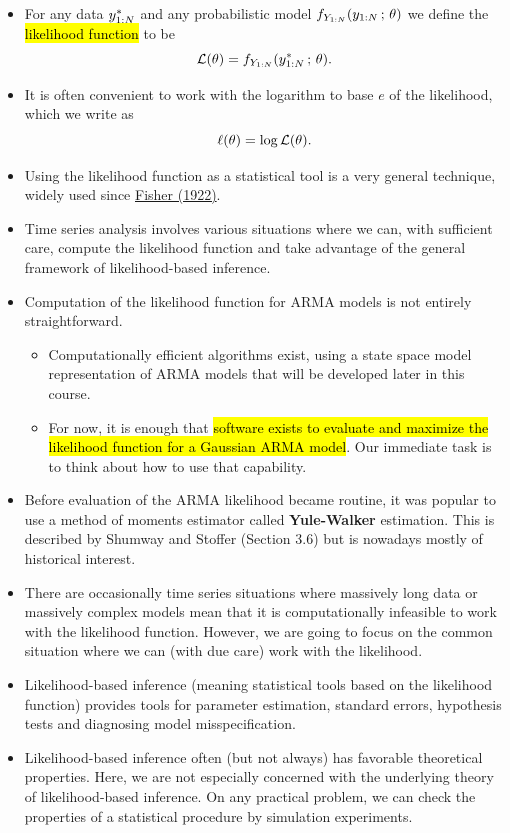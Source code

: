 \documentclass[]{article}
\begin{document}
\begin{itemize}
\item
  For any data \(y_{1:N}^*\) and any probabilistic model
  \(f_{Y_{1:N}}(y_{1:N}\, ; \,\theta)\) we define the \hl{likelihood
  function} to be
  \[ \mathcal{L}(\theta) = f_{Y_{1:N}}(y_{1:N}^*\, ; \,\theta).\]
\item
  It is often convenient to work with the logarithm to base \(e\) of the
  likelihood, which we write as \[\ell(\theta) = \log \mathcal{L}(\theta).\]
\item
  Using the likelihood function as a statistical tool is a very general
  technique, widely used since
  \href{https://en.wikipedia.org/wiki/Likelihood_function}{Fisher
  (1922)}.
\item
  Time series analysis involves various situations where we can, with
  sufficient care, compute the likelihood function and take advantage of
  the general framework of likelihood-based inference.
\item
  Computation of the likelihood function for ARMA models is not entirely
  straightforward.

  \begin{itemize}
  \item
    Computationally efficient algorithms exist, using a state space
    model representation of ARMA models that will be developed later in
    this course.
  \item
    For now, it is enough that \hl{software exists to evaluate and maximize
    the likelihood function for a Gaussian ARMA model}. Our immediate
    task is to think about how to use that capability.
  \end{itemize}
\item
  Before evaluation of the ARMA likelihood became routine, it was
  popular to use a method of moments estimator called
  \textbf{Yule-Walker} estimation. This is described by Shumway and
  Stoffer (Section 3.6) but is nowadays mostly of historical interest.
\item
  There are occasionally time series situations where massively long
  data or massively complex models mean that it is computationally
  infeasible to work with the likelihood function. However, we are going
  to focus on the common situation where we can (with due care) work
  with the likelihood.
\item
  Likelihood-based inference (meaning statistical tools based on the
  likelihood function) provides tools for parameter estimation, standard
  errors, hypothesis tests and diagnosing model misspecification.
\item
  Likelihood-based inference often (but not always) has favorable
  theoretical properties. Here, we are not especially concerned with the
  underlying theory of likelihood-based inference. On any practical
  problem, we can check the properties of a statistical procedure by
  simulation experiments.
\end{itemize}
\end{document}

